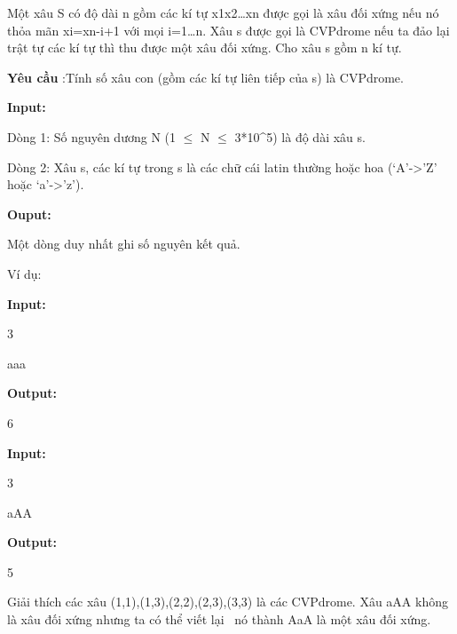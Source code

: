 



   Một xâu S có độ dài n gồm các kí tự x1x2…xn được gọi là xâu đối xứng nếu nó thỏa mãn xi=xn-i+1 với mọi i=1…n. Xâu s được gọi là CVPdrome nếu ta đảo lại trật tự các kí tự thì thu được một xâu đối xứng. Cho xâu s gồm n kí tự.   


\textbf{    Yêu cầu   }   :Tính số xâu con (gồm các kí tự liên tiếp của s) là CVPdrome.  




\textbf{    Input:   }


   Dòng 1: Số nguyên dương N (1 $\le$ N $\le$ 3*10^5) là độ dài xâu s.   


   Dòng 2: Xâu s, các kí tự trong s là các chữ cái latin thường hoặc hoa (‘A’->’Z’ hoặc ‘a’->’z’).  




\textbf{    Ouput:   }

   Một dòng duy nhất ghi số nguyên kết quả.  

   Ví dụ:  




\textbf{    Input:   }


   3   


   aaa   


\textbf{    Output:   }


   6  




\textbf{    Input:   }


   3   


   aAA   


\textbf{    Output:   }


   5  




   Giải thích các xâu (1,1),(1,3),(2,2),(2,3),(3,3) là các CVPdrome. Xâu aAA không là xâu đối xứng nhưng ta có thể viết lại  nó thành AaA là một xâu đối xứng.  

